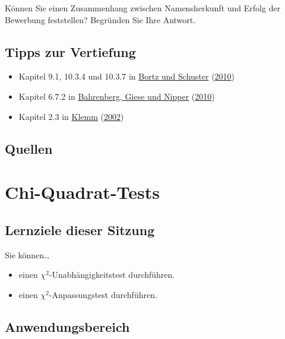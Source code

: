 \documentclass[
  ngerman,
]{article}
\providecommand{\tightlist}{%
  \setlength{\itemsep}{0pt}\setlength{\parskip}{0pt}}
\begin{document}
Können Sie einen Zusammenhang zwischen Namensherkunft und Erfolg der Bewerbung feststellen? Begründen Sie Ihre Antwort.

\hypertarget{tipps-zur-vertiefung-8}{%
\subsection{Tipps zur Vertiefung}\label{tipps-zur-vertiefung-8}}

\begin{itemize}
\tightlist
\item
  Kapitel 9.1, 10.3.4 und 10.3.7 in \protect\hyperlink{ref-bortz}{Bortz und Schuster} (\protect\hyperlink{ref-bortz}{2010})
\item
  Kapitel 6.7.2 in \protect\hyperlink{ref-bahrenberg}{Bahrenberg, Giese und Nipper} (\protect\hyperlink{ref-bahrenberg}{2010})
\item
  Kapitel 2.3 in \protect\hyperlink{ref-klemm}{Klemm} (\protect\hyperlink{ref-klemm}{2002})
\end{itemize}

\hypertarget{quellen-8}{%
\subsection{Quellen}\label{quellen-8}}

\hypertarget{chi-quadrat-tests}{%
\section{Chi-Quadrat-Tests}\label{chi-quadrat-tests}}

\hypertarget{lernziele-dieser-sitzung-9}{%
\subsection{Lernziele dieser Sitzung}\label{lernziele-dieser-sitzung-9}}

Sie können\ldots{}

\begin{itemize}
\tightlist
\item
  einen \(\chi^2\)-Unabhängigkeitstest durchführen.
\item
  einen \(\chi^2\)-Anpassungstest durchführen.
\end{itemize}

\hypertarget{anwendungsbereich}{%
\subsection{Anwendungsbereich}\label{anwendungsbereich}}
\end{document}
